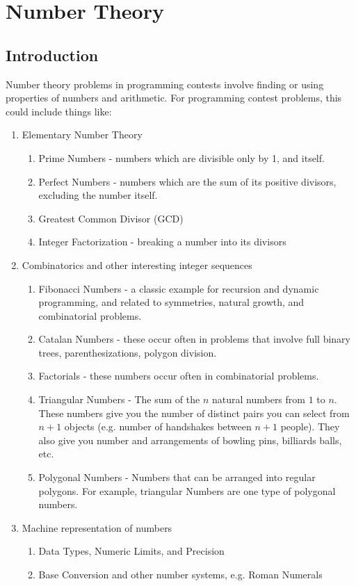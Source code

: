 \chapter{Number Theory}
\label{Chapter:NumberTheory}

\section{Introduction}

Number theory problems in programming contests involve finding or using properties of numbers and arithmetic. For programming contest problems, this could include things like:

\begin{enumerate}
\item Elementary Number Theory
	\begin{enumerate}
		\item Prime Numbers - numbers which are divisible only by 1, and itself.
		\item Perfect Numbers - numbers which are the sum of its positive divisors, excluding the number itself.
		\item Greatest Common Divisor (GCD)
		\item Integer Factorization - breaking a number into its divisors
	\end{enumerate}
\item Combinatorics and other interesting integer sequences
	\begin{enumerate}
		\item Fibonacci Numbers - a classic example for recursion and dynamic programming, and related to symmetries, natural growth, and combinatorial problems.
		\item Catalan Numbers - these occur often in problems that involve full binary trees, parenthesizations, polygon division.
		\item Factorials - these numbers occur often in combinatorial problems.
		\item Triangular Numbers - The sum of the $n$ natural numbers from $1$ to $n$. These numbers give you the number of distinct pairs you can select from $n+1$ objects (e.g. number of handshakes between $n+1$ people). They also give you number and arrangements of bowling pins, billiards balls, etc.
		\item Polygonal Numbers - Numbers that can be arranged into regular polygons. For example, triangular Numbers are one type of polygonal numbers.
	\end{enumerate}
\item Machine representation of numbers
	\begin{enumerate}
		\item Data Types, Numeric Limits, and Precision
		\item Base Conversion and other number systems, e.g. Roman Numerals
	\end{enumerate}
\end{enumerate}


